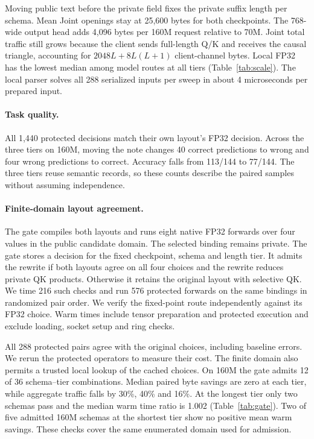 \documentclass[runningheads]{llncs}
\begin{document}
Moving public text before the private field fixes the private suffix
length per schema. Mean Joint openings stay at 25,600 bytes for both
checkpoints. The 768-wide output head adds 4,096 bytes per 160M request
relative to 70M. Joint total traffic still grows because the client sends
full-length Q/K and receives the causal triangle, accounting for
$2048L+8L(L+1)$ client-channel bytes. Local FP32 has the lowest median
among model routes at all tiers
(Table~\ref{tab:scale}). The local parser solves all 288 serialized
inputs per sweep in about 4 microseconds per prepared input.

\paragraph{Task quality.}
All 1,440 protected decisions match their own layout's FP32 decision.
Across the three tiers on 160M, moving the note changes 40 correct
predictions to wrong and four wrong predictions to correct. Accuracy
falls from 113/144 to 77/144. The three tiers reuse semantic records, so
these counts describe the paired samples without assuming independence.

\paragraph{Finite-domain layout agreement.}
The gate compiles both layouts and runs eight native FP32 forwards
over four values in the public candidate domain. The selected binding
remains private. The gate stores a decision for the fixed checkpoint,
schema and length tier. It admits the rewrite if both layouts agree
on all four choices and the rewrite reduces private QK products.
Otherwise it retains the original layout with selective QK. We time
216 such checks and run 576 protected forwards on the same bindings in
randomized pair order. We verify the fixed-point route independently
against its FP32 choice. Warm times include tensor preparation and
protected execution and exclude loading, socket setup and ring checks.

All 288 protected pairs agree with the original choices, including
baseline errors. We rerun the protected operators to measure their
cost. The finite domain also permits a trusted local lookup of the
cached choices. On 160M the gate admits 12 of 36 schema--tier combinations.
Median paired byte savings are zero at each tier, while aggregate
traffic falls by 30\%, 40\% and 16\%. At the longest tier only two
schemas pass and the median warm time ratio is 1.002
(Table~\ref{tab:gate}). Two of five admitted 160M schemas at the shortest
tier show no positive mean warm savings. These checks cover the same
enumerated domain used for admission.
\end{document}
